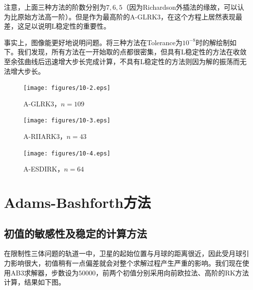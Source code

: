 \documentclass[lang=cn,10pt,bibend=bibtex]{elegantbook}
\begin{document}
注意，上面三种方法的阶数分别为$7,6,5$（因为Richardson外插法的缘故，可以认为比原始方法高一阶）。但是作为最高阶的A-GLRK$3$，在这个方程上居然表现最差，这足以说明L稳定性的重要性。

事实上，图像能更好地说明问题。将三种方法在Tolerance为$10^{-8}$时的解绘制如下。我们发现，所有方法在一开始取的点都很密集，但具有L稳定性的方法在收敛至余弦曲线后迅速增大步长完成计算，不具有L稳定性的方法则因为解的振荡而无法增大步长。

\begin{figure}[H]
  \centering
  \begin{minipage}[t]{0.32\linewidth}
      \centering
      \texttt{[image: figures/10-2.eps]}
      \caption*{\small A-GLRK$3$，$n=109$}
  \end{minipage}
  \hspace{.31em}
  \begin{minipage}[t]{0.32\linewidth}
      \centering
      \texttt{[image: figures/10-3.eps]}
      \caption*{\small A-RIIARK$3$，$n=43$}
  \end{minipage}
  \hspace{.31em}
  \begin{minipage}[t]{0.32\linewidth}
      \centering
      \texttt{[image: figures/10-4.eps]}
      \caption*{\small A-ESDIRK，$n=64$}
  \end{minipage}
\end{figure}

\section{Adams-Bashforth方法}

\subsection{初值的敏感性及稳定的计算方法}

在限制性三体问题的轨道一中，卫星的起始位置与月球的距离很近，因此受月球引力影响很大，初值稍有一点偏差就会对整个求解过程产生严重的影响。我们现在使用AB$3$求解器，步数设为$50000$，前两个初值分别采用向前欧拉法、高阶的RK方法计算，结果如下图。
\end{document}
